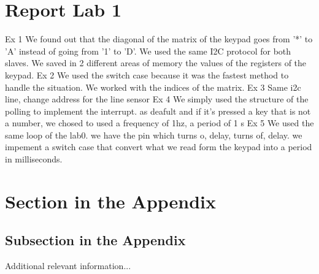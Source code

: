 \documentclass[english]{article}
\begin{document}
\section{Report Lab 1}
Ex 1
We found out that the diagonal of the matrix of the keypad goes from '*' to 'A' instead of going from '1' to 'D'. We used the same I2C protocol for both slaves. We saved in 2 different areas of memory the values of the registers of the keypad.
Ex 2
We used the switch case because it was the fastest method to handle the situation. We worked with the indices of the matrix.
Ex 3
Same i2c line, change address for the line sensor
Ex 4
We simply used the structure of the polling to implement the interrupt. as deafult and if it's pressed a key that is not a number, we chosed to used a frequency of 1hz, a period of 1 s
Ex 5
We used the same loop of the lab0. we have the pin which turns o, delay, turns of, delay. we impement a switch case that convert what we read form the keypad into a period in milliseconds.
\clearpage
\appendix

\section{Section in the Appendix}
\label{sec:app1}

\subsection{Subsection in the Appendix}
\label{subsec:app2}

Additional relevant information...
\end{document}
